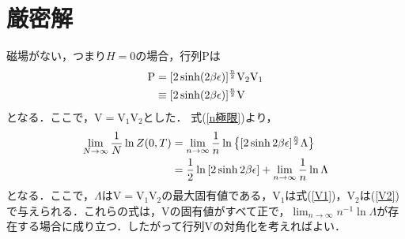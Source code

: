 \documentclass[a4paper,11pt]{jsreport}
\begin{document}
\section{厳密解}
磁場がない，つまり$H=0$の場合，行列$\mathrm{P}$は
\begin{align}
  \mathrm{P}
  &= [2 \sinh (2 \beta \epsilon)]^{\frac{n}{2}} \mathrm{V}_2 \mathrm{V}_1 \notag \\
  &\equiv [2 \sinh (2 \beta \epsilon)]^{\frac{n}{2}} \mathrm{V}
  \label{行列P磁場ゼロ}
\end{align}
となる．ここで，$\mathrm{V} = \mathrm{V}_1 \mathrm{V}_2$とした．
式(\ref{n極限})より，
\begin{align}
  \lim_{N \rightarrow \infty} \frac{1}{N} \ln{Z(0, T)} 
  &= \lim_{n \rightarrow \infty} \frac{1}{n} \ln{\left\{[2 \sinh{2 \beta \epsilon}]^{\frac{n}{2}}\Lambda\right\}} \notag \\
  &= \frac{1}{2} \ln{[2 \sinh{2 \beta \epsilon}]}
  + \lim_{n \rightarrow \infty} \frac{1}{n} \ln{\Lambda}
\end{align}
となる．ここで，$\Lambda$は$\mathrm{V} = \mathrm{V}_1 \mathrm{V}_2$の最大固有値である，$\mathrm{V}_1$は式(\ref{V1})，$\mathrm{V}_2$は(\ref{V2})で与えられる．これらの式は，$\mathrm{V}$の固有値がすべて正で，$\lim_{n \rightarrow \infty} n^{-1}\ln{\Lambda}$が存在する場合に成り立つ．したがって行列$\mathrm{V}$の対角化を考えればよい．
\end{document}
